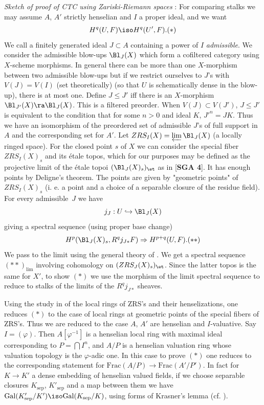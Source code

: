 \documentclass[10pt]{../fichiers-configuration-latex/smfart}
\begin{document}
\textit{Sketch of proof of CTC using Zariski-Riemann spaces}
: For comparing stalks we may assume $A$, $A'$ strictly
henselian and $I$ a proper ideal, and we want $$ H^q(U,F)
\iso H^q(U',F). \leqno (*) $$ We call a finitely generated
ideal $J \subset A$ containing a power of $I$
\textit{admissible}. We consider the admissible blow-ups
$\Bl_{J}(X)$ which form a cofiltered category using
$X$-scheme morphisms. In general there can be more than one
$X$-morphism between two admissible blow-ups but if we
restrict ourselves to $J$'s with $V(J) = V(I)$ (set
theoretically) (so that $U$ is schematically dense in the
blow-up), there is at most one. Define $J \le J'$ iff there
is an $X$-morphism $\Bl_{J'}(X) \ra
\Bl_J(X)$. This is a filtered preorder. When $V(J)
\subset V(J')$, $J \le J'$ is equivalent to the condition
that for some $n >0$ and ideal $K$, $J'^n = JK$. Thus we
have an isomorphism of the preordered set of admissible
$J$'s of full support in $A$ and the corresponding set for
$A'$. Let $ZRS_I(X) = \varprojlim \Bl_J(X)$ (a
locally ringed space). For the closed point $s$ of $X$ we
can consider the special fiber $ZRS_I(X)_s$ and its étale
topos, which for our purposes may be defined as the
projective limit of the étale topoi
$(\Bl_J(X)_{s})_{\et}$ as in
[\textbf{SGA 4}]. It has enough points by Deligne's theorem.
The points are given by "geometric points" of $ZRS_I(X)_s$
(i. e. a point and a choice of a separable closure of the
residue field). For every admissible $J$ we have $$ j_J : U
\hookrightarrow \Bl_J(X) $$ giving a spectral
sequence (using proper base change) $$
H^p(\Bl_J(X)_s, R^qj_{J*}F) \Rightarrow
H^{p+q}(U,F). \leqno (**) $$ We pass to the limit using the
general theory of . We get a spectral sequence
$(**)_{\mathrm{lim}}$ involving cohomology on
$(ZRS_J(X)_s)_{\et}$. Since the latter topos is the
same for $X'$, to show $(*)$ we use the morphism of the limit
spectral sequence to reduce to stalks of the limits of the
$R^qj_{J*}$ sheaves.

Using the study in \cite{TUBULAR@Fujiwara} of the local rings of ZRS's
and their henselizations, one reduces $(*)$ to the case of
local rings at geometric points of the special fibers of
ZRS's.  Thus we are reduced to the case $A$, $A'$ are
henselian and $I$-valuative. Say $I = (\varphi)$. Then
$A[\varphi^{-1}]$ is a henselian local ring with maximal
ideal corresponding to $P = ⋂ I^n$, and $A/P$ is a
henselian valuation ring whose valuation topology is the
$\varphi$-adic one. In this case to prove $(*)$ one reduces to
the corresponding statement for $\mathrm{Frac}(A/P) \to
\mathrm{Frac}(A'/P')$. In fact for $K \to K'$ a dense
embedding of henselian valued fields, if we choose separable
closures $K_{\mathrm{sep}}$, $K'_{\mathrm{sep}}$ and a map
between them we have $\mathrm{Gal}(K'_{\mathrm{sep}}/K')
\iso \mathrm{Gal}(K_{\mathrm{sep}}/K)$, using forms of
Krasner's lemma (cf. ).
\end{document}
